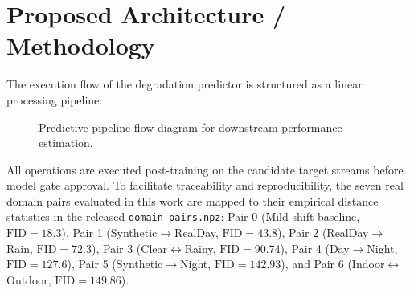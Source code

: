 \documentclass[10pt,twocolumn,letterpaper]{article}
\begin{document}
\section{Proposed Architecture / Methodology}
The execution flow of the degradation predictor is structured as a linear processing pipeline:
\begin{figure}[htbp]
\centering
{}
\caption{Predictive pipeline flow diagram for downstream performance estimation.}
\label{fig:pipeline}
\end{figure}

All operations are executed post-training on the candidate target streams before model gate approval. To facilitate traceability and reproducibility, the seven real domain pairs evaluated in this work are mapped to their empirical distance statistics in the released \texttt{domain\_pairs.npz}: Pair 0 (Mild-shift baseline, $\text{FID}=18.3$), Pair 1 (Synthetic$\rightarrow$RealDay, $\text{FID}=43.8$), Pair 2 (RealDay$\rightarrow$Rain, $\text{FID}=72.3$), Pair 3 (Clear$\leftrightarrow$Rainy, $\text{FID}=90.74$), Pair 4 (Day$\rightarrow$Night, $\text{FID}=127.6$), Pair 5 (Synthetic$\rightarrow$Night, $\text{FID}=142.93$), and Pair 6 (Indoor$\leftrightarrow$Outdoor, $\text{FID}=149.86$).
\end{document}
